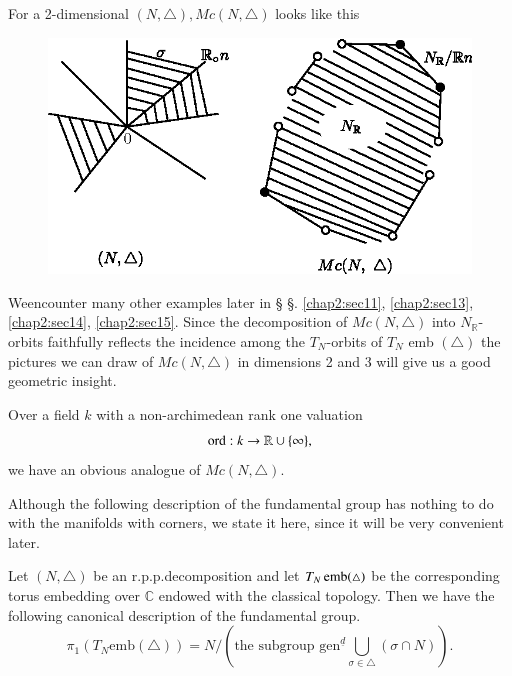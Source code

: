 \begin{example*}
For a 2-dimensional $(N, \triangle), Mc(N, \triangle)$ looks like this  
\begin{figure}[H]
\centering 
\includegraphics{vol58-fig/fig58-59.eps} 
\end{figure}
 
We\pageoriginale encounter many other examples later in \S
\S. \ref{chap2:sec11}, \ref{chap2:sec13}, \ref{chap2:sec14}, 
\ref{chap2:sec15}. Since the decomposition of $Mc (N, \triangle)$ into
$N_{\mathbb{R}}$-orbits faithfully reflects the incidence among the
$T_N$-orbits of $T_N$ emb $(\triangle)$ the pictures we can draw of
$Mc (N, \triangle)$ in dimensions 2 and 3 will  give us a good
geometric insight. 
\end{example*}

\begin{remark*}
Over a field $k$ with a non-archimedean rank one valuation
$$
\operatorname{ord} : k \to \mathbb{R} \cup \{ \infty \}, 
$$
we have an obvious analogue of $Mc (N, \triangle)$.
\end{remark*}

Although the following description of the fundamental group has
nothing to do with the manifolds with corners, we state it here, since
it will be very convenient later. 

\begin{prop}[Mumford]\label{chap2:prop10.2}
Let $(N, \triangle)$ be an r.p.p.decomposition and let $T_N \operatorname{emb}
(\triangle)$ be the corresponding torus embedding over 
$\mathbb{C}$ endowed with the classical topology. Then we have the
following canonical description of the fundamental group. 
$$
\pi_1 (T_N \text{emb} (\triangle)) = N/ (\text{the subgroup
  gen}^{\underline{d}} \bigcup_{\sigma \in \triangle} (\sigma \cap
N)). 
$$
\end{prop}

